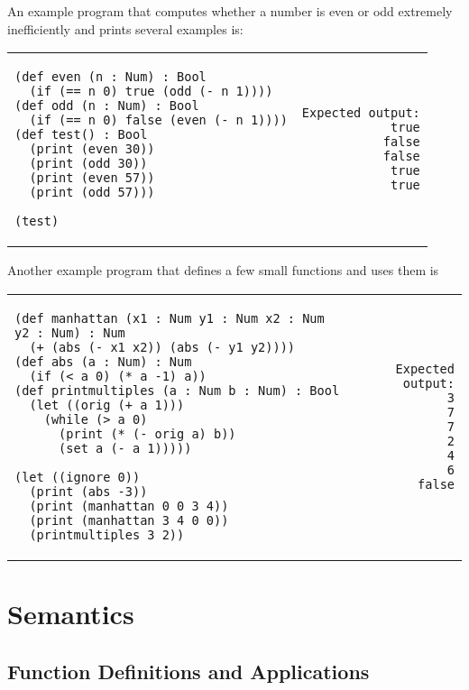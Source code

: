 \documentclass[10pt, oneside]{article}
\begin{document}
An example program that computes whether a number is even or odd extremely
inefficiently and prints several examples is:

\begin{tabular}{lr}
\begin{lstlisting}
(def even (n : Num) : Bool
  (if (== n 0) true (odd (- n 1))))
(def odd (n : Num) : Bool
  (if (== n 0) false (even (- n 1))))
(def test() : Bool
  (print (even 30))
  (print (odd 30))
  (print (even 57))
  (print (odd 57)))

(test)
\end{lstlisting}
& \hspace{5em}
\begin{lstlisting}
Expected output:
true
false
false
true
true
\end{lstlisting}
\end{tabular}

Another example program that defines a few small functions and uses them is

\begin{tabular}{lr}
\begin{lstlisting}
(def manhattan (x1 : Num y1 : Num x2 : Num y2 : Num) : Num
  (+ (abs (- x1 x2)) (abs (- y1 y2))))
(def abs (a : Num) : Num
  (if (< a 0) (* a -1) a))
(def printmultiples (a : Num b : Num) : Bool
  (let ((orig (+ a 1)))
    (while (> a 0)
      (print (* (- orig a) b))
      (set a (- a 1)))))

(let ((ignore 0))
  (print (abs -3))
  (print (manhattan 0 0 3 4))
  (print (manhattan 3 4 0 0))
  (printmultiples 3 2))
\end{lstlisting}
& \hspace{5em}
\begin{lstlisting}
Expected output:
3
7
7
2
4
6
false
\end{lstlisting}
\end{tabular}

\section*{Semantics}

\subsection*{Function Definitions and Applications}
\end{document}
